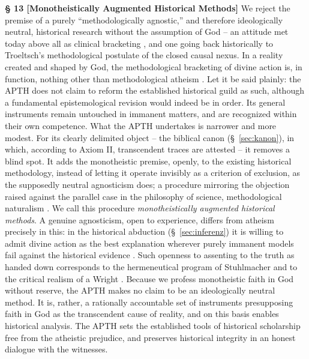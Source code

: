 \documentclass[11pt,a4paper]{article}
\makeatletter
\newcommand{\apth}{{\apthfont APTH}\hspace{0.15em}\xspace}
\newcommand{\apthsec}[3]{%
  \phantomsection%
  \def\@currentlabel{#1}%
  \label{sec:#3}%
  \textbf{§ #1 [#2]}%
}
\makeatother
\begin{document}
\apthsec{13}{Monotheistically Augmented Historical Methods}{adjungierung} We reject the premise of a purely ``methodologically agnostic,'' and therefore ideologically neutral, historical research without the assumption of God -- an attitude met today above all as clinical bracketing \citep{meier1991}, and one going back historically to Troeltsch's \citeyearpar{troeltsch1913} methodological postulate of the closed causal nexus. In a reality created and shaped by God, the methodological bracketing of divine action is, in function, nothing other than methodological atheism \citep{schlatter1905,pannenberg1961,maier1974,linnemann1999}. Let it be said plainly: the \apth does not claim to reform the established historical guild as such, although a fundamental epistemological revision would indeed be in order. Its general instruments remain untouched in immanent matters, and are recognized within their own competence. What the \apth undertakes is narrower and more modest. For its clearly delimited object -- the biblical canon (§~\ref{sec:kanon}), in which, according to Axiom II, transcendent traces are attested -- it removes a blind spot. It adds the monotheistic premise, openly, to the existing historical methodology, instead of letting it operate invisibly as a criterion of exclusion, as the supposedly neutral agnosticism does; a procedure mirroring the objection raised against the parallel case in the philosophy of science, methodological naturalism \citep{plantinga2011}. We call this procedure \textit{monotheistically augmented historical methods}. A genuine agnosticism, open to experience, differs from atheism precisely in this: in the historical abduction (§~\ref{sec:inferenz}) it is willing to admit divine action as the best explanation wherever purely immanent models fail against the historical evidence \citep{keener2011,licona2010,wright2003}. Such openness to assenting to the truth as handed down corresponds to the hermeneutical program of Stuhlmacher \citep{stuhlmacher1979,stuhlmacher1989} and to the critical realism of a Wright \citep{wright1992}. Because we profess monotheistic faith in God without reserve, the \apth makes no claim to be an ideologically neutral method. It is, rather, a rationally accountable set of instruments presupposing faith in God as the transcendent cause of reality, and on this basis enables historical analysis. The \apth sets the established tools of historical scholarship free from the atheistic prejudice, and preserves historical integrity in an honest dialogue with the witnesses.
\end{document}
